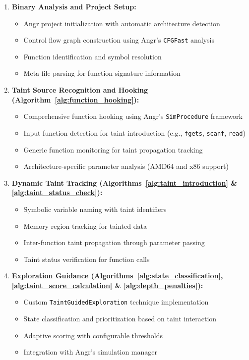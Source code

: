 \begin{enumerate}
    \item \textbf{Binary Analysis and Project Setup:}
        \begin{itemize}
            \item Angr project initialization with automatic architecture detection
            \item Control flow graph construction using Angr's \texttt{CFGFast} analysis
            \item Function identification and symbol resolution
            \item Meta file parsing for function signature information
        \end{itemize}

    \item \textbf{Taint Source Recognition and Hooking (Algorithm~\ref{alg:function_hooking}):}
        \begin{itemize}
            \item Comprehensive function hooking using Angr's \texttt{SimProcedure} framework
            \item Input function detection for taint introduction (e.g., \texttt{fgets}, \texttt{scanf}, \texttt{read})
            \item Generic function monitoring for taint propagation tracking
            \item Architecture-specific parameter analysis (AMD64 and x86 support)
        \end{itemize}

    \item \textbf{Dynamic Taint Tracking (Algorithms~\ref{alg:taint_introduction} \& \ref{alg:taint_status_check}):}
        \begin{itemize}
            \item Symbolic variable naming with taint identifiers
            \item Memory region tracking for tainted data
            \item Inter-function taint propagation through parameter passing
            \item Taint status verification for function calls
        \end{itemize}

    \item \textbf{Exploration Guidance (Algorithms~\ref{alg:state_classification}, \ref{alg:taint_score_calculation} \& \ref{alg:depth_penalties}):}
        \begin{itemize}
            \item Custom \texttt{TaintGuidedExploration} technique implementation
            \item State classification and prioritization based on taint interaction
            \item Adaptive scoring with configurable thresholds
            \item Integration with Angr's simulation manager
        \end{itemize}


\end{enumerate}
